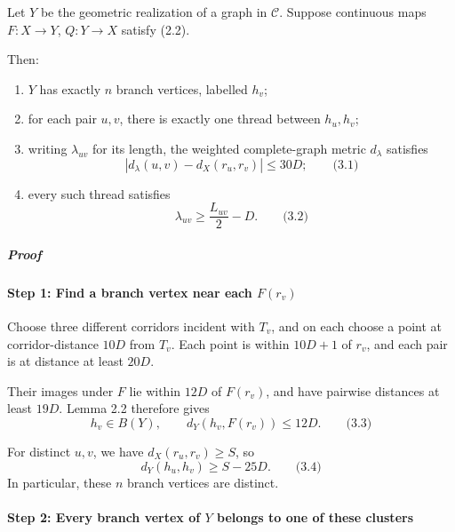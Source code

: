 \documentclass[
  11pt,
  a4paper,
]{article}
\providecommand{\tightlist}{%
  \setlength{\itemsep}{0pt}\setlength{\parskip}{0pt}}
\begin{document}
Let \(Y\) be the geometric realization of a graph in \(\mathcal C\).
Suppose continuous maps \(F:X\to Y\), \(Q:Y\to X\) satisfy (2.2).

Then:

\begin{enumerate}
\def\labelenumi{\arabic{enumi}.}
\tightlist
\item
  \(Y\) has exactly \(n\) branch vertices, labelled \(h_v\);
\item
  for each pair \(u,v\), there is exactly one thread between
  \(h_u,h_v\);
\item
  writing \(\lambda_{uv}\) for its length, the weighted complete-graph
  metric \(d_\lambda\) satisfies \[
  |d_\lambda(u,v)-d_X(r_u,r_v)|\le30D;
  \qquad\text{(3.1)}
  \]
\item
  every such thread satisfies \[
  \lambda_{uv}\ge \frac{L_{uv}}2-D.
  \qquad\text{(3.2)}
  \]
\end{enumerate}

\subparagraph{Proof}\label{proof-3}

\paragraph{\texorpdfstring{Step 1: Find a branch vertex near each
\(F(r_v)\)}{Step 1: Find a branch vertex near each F(r\_v)}}\label{step-1-find-a-branch-vertex-near-each-fr_v}

Choose three different corridors incident with \(T_v\), and on each
choose a point at corridor-distance \(10D\) from \(T_v\). Each point is
within \(10D+1\) of \(r_v\), and each pair is at distance at least
\(20D\).

Their images under \(F\) lie within \(12D\) of \(F(r_v)\), and have
pairwise distances at least \(19D\). Lemma 2.2 therefore gives \[
h_v\in B(Y),\qquad d_Y(h_v,F(r_v))\le12D.
\qquad\text{(3.3)}
\]

For distinct \(u,v\), we have \(d_X(r_u,r_v)\ge S\), so \[
d_Y(h_u,h_v)\ge S-25D.
\qquad\text{(3.4)}
\] In particular, these \(n\) branch vertices are distinct.

\paragraph{\texorpdfstring{Step 2: Every branch vertex of \(Y\) belongs
to one of these
clusters}{Step 2: Every branch vertex of Y belongs to one of these clusters}}\label{step-2-every-branch-vertex-of-y-belongs-to-one-of-these-clusters}
\end{document}

